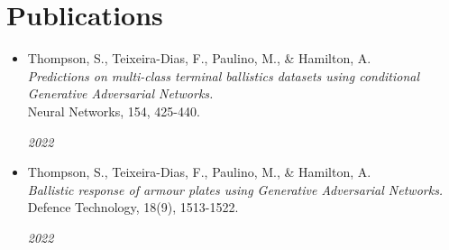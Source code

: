 \documentclass[letterpaper,11pt]{article}
\begin{document}

\section{Publications}
\begin{itemize}[leftmargin=0.2in, label={}]
  \item 
    \begin{minipage}[t]{0.75\linewidth}
        Thompson, S., Teixeira-Dias, F., Paulino, M., \& Hamilton, A. \\
        \textit{Predictions on multi-class terminal ballistics datasets using conditional Generative Adversarial Networks.} \\
        Neural Networks, 154, 425-440.
    \end{minipage} \hfill \textit{2022}
\end{itemize}

\begin{itemize}[leftmargin=0.2in, label={}]
  \item
  \begin{minipage}[t]{0.75\linewidth}
      Thompson, S., Teixeira-Dias, F., Paulino, M., \& Hamilton, A. \\
      \textit{Ballistic response of armour plates using Generative Adversarial Networks.} \\
      Defence Technology, 18(9), 1513-1522.
  \end{minipage} \hfill \textit{2022}
\end{itemize}
\end{document}

